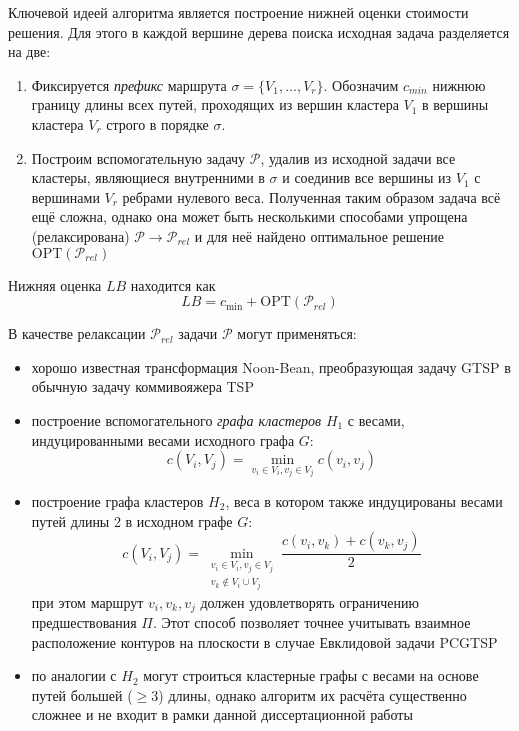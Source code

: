 Ключевой идеей алгоритма является построение нижней оценки стоимости решения.
Для этого в каждой вершине дерева поиска исходная задача разделяется на две:
\begin{enumerate}
    \item
    Фиксируется {\it префикс}
    маршрута $\sigma=\{V_1, \dots, V_r\}$.
    Обозначим $c_{min}$ нижнюю границу длины
    всех путей, проходящих из вершин кластера $V_1$
    в вершины кластера $V_r$ строго в порядке $\sigma$.
    \item
    Построим вспомогательную задачу $\mathcal P$,
    удалив из исходной задачи все кластеры,
    являющиеся внутренними в $\sigma$ и
    соединив все вершины из $V_1$ с вершинами $V_r$
    ребрами нулевого веса.
    Полученная таким образом задача всё ещё сложна,
    однако она может быть несколькими способами
    упрощена (релаксирована) $\mathcal P \to \mathcal P_{rel}$
    и для неё найдено оптимальное решение $\mathrm{OPT}(\mathcal P_{rel})$
\end{enumerate}
Нижняя оценка $LB$
находится как
\begin{equation}
    \label{eq:pcgtsp-lb}
    LB = c_{\min} + \mathrm{OPT}(\mathcal P_{rel})
\end{equation}

В качестве релаксации $\mathcal P_{rel}$ задачи $\mathcal P$
могут применяться:
\begin{itemize}
    \item
    хорошо известная трансформация Noon-Bean,
    преобразующая задачу GTSP в обычную задачу
    коммивояжера TSP
    \item
    построение вспомогательного {\it графа кластеров} $H_1$
    с весами, индуцированными весами исходного графа $G$:
    $$
    c(V_i, V_j) = \min_{v_i \in V_i, v_j \in V_j} c(v_i, v_j)
    $$
    \item
    построение графа кластеров $H_2$,
    веса в котором также индуцированы весами путей длины 2 в исходном графе $G$:
    $$
    c(V_i, V_j) =
        \min_{\substack{v_i \in V_i, v_j \in V_j\\v_k \notin V_i \cup V_j}  }
        \frac{c(v_i, v_k) + c(v_k, v_j)}{2}
    $$
    при этом маршрут $v_i, v_k, v_j$ должен удовлетворять ограничению предшествования $\Pi$.
    Этот способ позволяет точнее учитывать взаимное расположение контуров на плоскости
    в случае Евклидовой задачи PCGTSP
    \item
    по аналогии с $H_2$ могут строиться кластерные графы с весами на основе
    путей большей ($\geqslant 3$) длины,
    однако алгоритм их расчёта существенно сложнее и
    не входит в рамки данной диссертационной работы
\end{itemize}

